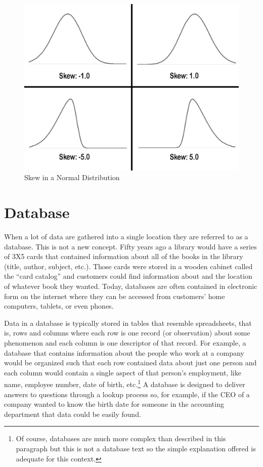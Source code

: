 \begin{figure}[H]
	\centering
	\includegraphics[width=\maxwidth{.95\linewidth}]{gfx/06-Skew}
	\caption{Skew in a Normal Distribution}
	\label{fig06-03}
\end{figure}

\section{Database}

When a lot of data are gathered into a single location they are referred to as a \gls{database}. This is not a new concept. Fifty years ago a library would have a series of 3X5 cards that contained information about all of the books in the library (title, author, subject, etc.). Those cards were stored in a wooden cabinet called the ``card catalog'' and customers could find information about and the location of whatever book they wanted. Today, databases are often contained in electronic form on the internet where they can be accessed from customers' home computers, tablets, or even phones.

Data in a database is typically stored in tables that resemble spreadsheets, that is, rows and columns where each row is one record (or observation) about some phenomenon and each column is one descriptor of that record. For example, a database that contains information about the people who work at a company would be organized such that each row contained data about just one person and each column would contain a single aspect of that person's employment, like name, employee number, date of birth, etc.\footnote{Of course, databases are much more complex than described in this paragraph but this is not a database text so the simple explanation offered is adequate for this context.} A database is designed to deliver answers to questions through a lookup process so, for example, if the CEO of a company wanted to know the birth date for someone in the accounting department that data could be easily found. 

